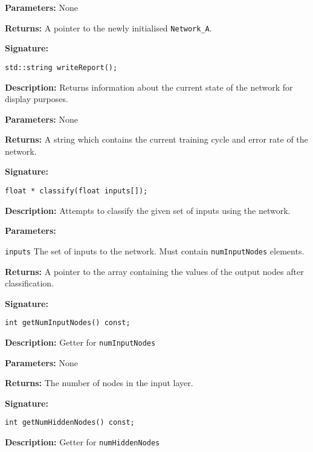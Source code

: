 \documentclass[a4paper]{article}
\begin{document}
\textbf{Parameters: } None

\textbf{Returns: }
A pointer to the newly initialised \lstinline{Network_A}.

\hrulefill %

\textbf{Signature:} \begin{lstlisting}
std::string writeReport();
\end{lstlisting}

\textbf{Description: }
Returns information about the current state of the network for display purposes.

\textbf{Parameters: } None

\textbf{Returns: }
A string which contains the current training cycle and error rate of the network.

\hrulefill %

\textbf{Signature:} \begin{lstlisting}
float * classify(float inputs[]);
\end{lstlisting}
\textbf{Description: }
Attempts to classify the given set of inputs using the network.

\textbf{Parameters: }

\lstinline{inputs} The set of inputs to the network. Must contain \lstinline{numInputNodes} elements.

\textbf{Returns: }
A pointer to the array containing the values of the output nodes after classification. 
\hrulefill %

\textbf{Signature:} \begin{lstlisting}
int getNumInputNodes() const;
\end{lstlisting}

\textbf{Description: }
Getter for \lstinline{numInputNodes}

\textbf{Parameters: } None

\textbf{Returns: }
The number of nodes in the input layer.

\hrulefill %

\textbf{Signature:} \begin{lstlisting}
int getNumHiddenNodes() const;
\end{lstlisting}

\textbf{Description: }
Getter for \lstinline{numHiddenNodes}
\end{document}
